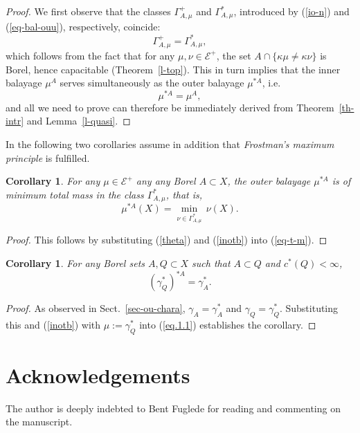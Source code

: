 \documentclass[12pt,a4paper,reqno]{amsart} %
\theoremstyle{lause}
\theoremstyle{maaritelma}
\theoremstyle{lause}
\newtheorem{corollary}[theorem]{Corollary}
\theoremstyle{maaritelma}
\numberwithin{equation}{section}
\begin{document}
\begin{proof} We first observe that the classes $\Gamma_{A,\mu}^+$ and $\Gamma_{A,\mu}^*$, introduced by (\ref{io-n}) and (\ref{eq-bal-ouu}), respectively, coincide:
\begin{equation}\label{theta}\Gamma_{A,\mu}^+=\Gamma_{A,\mu}^*,\end{equation}
which follows from the fact that for any $\mu,\nu\in\mathcal E^+$, the set $A\cap\{\kappa\mu\ne\kappa\nu\}$ is Borel, hence capacitable (Theorem~\ref{l-top}).
This in turn implies that the inner balayage $\mu^A$ serves simultaneously as the outer balayage $\mu^{*A}$, i.e.
\begin{equation}\label{inotb}
  \mu^{*A}=\mu^A,
\end{equation}
and
all we need to prove can therefore be immediately derived from Theorem~\ref{th-intr} and Lemma~\ref{l-quasi}.
\end{proof}

In the following two corollaries assume in addition that {\it Frostman's maximum principle\/} is fulfilled.

\begin{corollary}\label{bal-tot-m-ou}
For any\/ $\mu\in\mathcal E^+$ any any Borel\/ $A\subset X$, the outer balayage\/ $\mu^{*A}$ is of minimum total mass in the class\/ $\Gamma_{A,\mu}^*$, that is,
\[\mu^{*A}(X)=\min_{\nu\in\Gamma_{A,\mu}^*}\,\nu(X).\]
\end{corollary}

\begin{proof} This follows by substituting (\ref{theta}) and (\ref{inotb}) into (\ref{eq-t-m}).\end{proof}

\begin{corollary}\label{prop.1.1-ou}
For any Borel sets\/ $A,Q\subset X$ such that\/ $A\subset Q$ and\/ $c^*(Q)<\infty$,
\[(\gamma^*_Q)^{*A}=\gamma^*_A.\]
\end{corollary}

\begin{proof} As observed in Sect.~\ref{sec-ou-chara}, $\gamma_A=\gamma_A^*$ and $\gamma_Q=\gamma_Q^*$. Substituting this and (\ref{inotb}) with $\mu:=\gamma^*_Q$ into (\ref{eq.1.1}) establishes the corollary.\end{proof}

\section{Acknowledgements} The author is deeply indebted to Bent Fuglede for reading and commenting on the manuscript.
\end{document}
